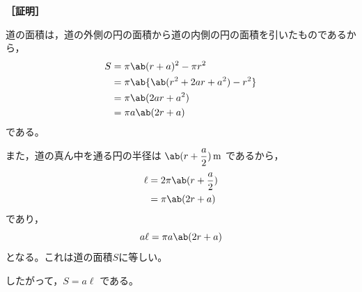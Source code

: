 \documentclass[article,paper=b6]{jlreq}
\begin{document}
\noindent\textbf{［証明］}

道の面積は，道の外側の円の面積から道の内側の円の面積を引いたものであるから，
\begin{align*}
S &{}={} {\pi}\ab(r + a)^{2} - {\pi}{r}^{2}\\
&{}={} {\pi}\ab\{\ab({r}^{2}  + 2ar + {a}^{2}) - {r}^{2}\}\\
&{}={} {\pi}\ab(2ar + {a}^{2})\\
&{}={} {\pi}a\ab(2r + a)
\end{align*}
である。

また，道の真ん中を通る円の半径は $\ab(r + \dfrac{a}{2}){\,}\textrm{m}$ であるから，
\begin{align*}
\ell &{}={} 2{\pi}\ab(r + \dfrac{a}{2})\\
&{}={} {\pi}\ab(2r + a)
\end{align*}
であり，
$$a\ell = {\pi}a\ab(2r + a)$$
となる。これは道の面積$S$に等しい。

したがって，$S = a\ell$ である。
\end{document}
